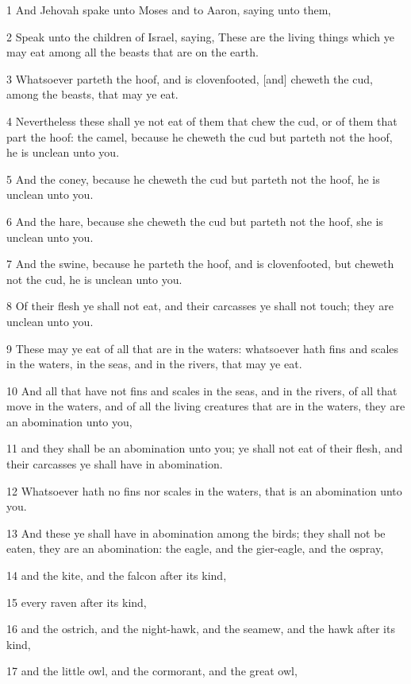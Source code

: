 \par 1 And Jehovah spake unto Moses and to Aaron, saying unto them,
\par 2 Speak unto the children of Israel, saying, These are the living things which ye may eat among all the beasts that are on the earth.
\par 3 Whatsoever parteth the hoof, and is clovenfooted, [and] cheweth the cud, among the beasts, that may ye eat.
\par 4 Nevertheless these shall ye not eat of them that chew the cud, or of them that part the hoof: the camel, because he cheweth the cud but parteth not the hoof, he is unclean unto you.
\par 5 And the coney, because he cheweth the cud but parteth not the hoof, he is unclean unto you.
\par 6 And the hare, because she cheweth the cud but parteth not the hoof, she is unclean unto you.
\par 7 And the swine, because he parteth the hoof, and is clovenfooted, but cheweth not the cud, he is unclean unto you.
\par 8 Of their flesh ye shall not eat, and their carcasses ye shall not touch; they are unclean unto you.
\par 9 These may ye eat of all that are in the waters: whatsoever hath fins and scales in the waters, in the seas, and in the rivers, that may ye eat.
\par 10 And all that have not fins and scales in the seas, and in the rivers, of all that move in the waters, and of all the living creatures that are in the waters, they are an abomination unto you,
\par 11 and they shall be an abomination unto you; ye shall not eat of their flesh, and their carcasses ye shall have in abomination.
\par 12 Whatsoever hath no fins nor scales in the waters, that is an abomination unto you.
\par 13 And these ye shall have in abomination among the birds; they shall not be eaten, they are an abomination: the eagle, and the gier-eagle, and the ospray,
\par 14 and the kite, and the falcon after its kind,
\par 15 every raven after its kind,
\par 16 and the ostrich, and the night-hawk, and the seamew, and the hawk after its kind,
\par 17 and the little owl, and the cormorant, and the great owl,
